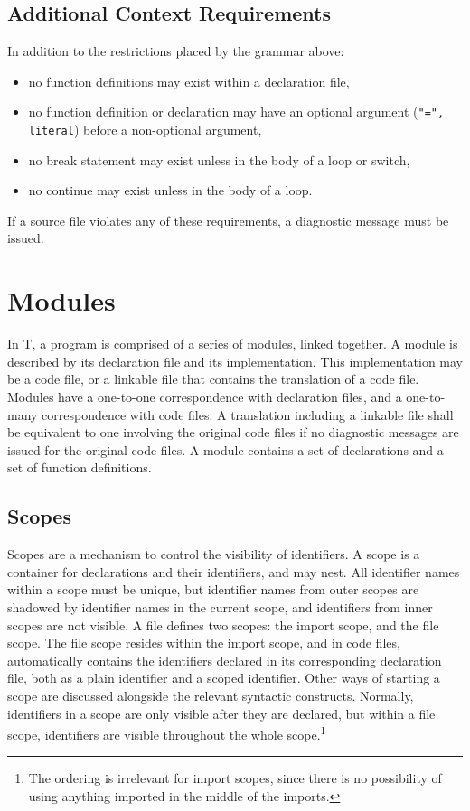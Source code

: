 \documentclass[letterpaper,12pt]{book}
\begin{document}
\section{Additional Context Requirements}

In addition to the restrictions placed by the grammar above:
\begin{itemize}
	\item no function definitions may exist within a declaration file,
	\item no function definition or declaration may have an optional argument (\texttt{"=", literal}) before a non-optional argument,
	\item no break statement may exist unless in the body of a loop or switch,
	\item no continue may exist unless in the body of a loop.
\end{itemize}

If a source file violates any of these requirements, a diagnostic message must be issued.

\chapter{Modules}

In T, a program is comprised of a series of modules, linked together. A module is described by its declaration file and its implementation. This implementation may be a code file, or a linkable file that contains the translation of a code file. Modules have a one-to-one correspondence with declaration files, and a one-to-many correspondence with code files. A translation including a linkable file shall be equivalent to one involving the original code files if no diagnostic messages are issued for the original code files. A module contains a set of declarations and a set of function definitions.

\section{Scopes}

Scopes are a mechanism to control the visibility of identifiers. A scope is a container for declarations and their identifiers, and may nest. All identifier names within a scope must be unique, but identifier names from outer scopes are shadowed by identifier names in the current scope, and identifiers from inner scopes are not visible. A file defines two scopes: the import scope, and the file scope. The file scope resides within the import scope, and in code files, automatically contains the identifiers declared in its corresponding declaration file, both as a plain identifier and a scoped identifier. Other ways of starting a scope are discussed alongside the relevant syntactic constructs. Normally, identifiers in a scope are only visible after they are declared, but within a file scope, identifiers are visible throughout the whole scope.\footnote{The ordering is irrelevant for import scopes, since there is no possibility of using anything imported in the middle of the imports.}
\end{document}
